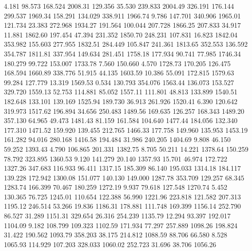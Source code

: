    4.181   98.573  168.524      2008.31
 129.356   35.530  239.833      2004.49
 326.191  176.144  299.537      1969.34
 158.291  134.029  338.911      1966.74
   9.786  147.701  340.906      1965.01
 121.734   23.383  272.968      1934.27
 191.564  100.044  207.728      1866.25
 207.833   34.917   11.881      1862.60
 197.454   47.394  231.352      1850.70
 248.231  107.831   16.823      1842.04
 353.982  155.603  277.955      1832.51
 284.449  105.847  241.361      1813.65
 352.553  136.592  354.787      1811.81
 337.954  149.634  281.451      1758.18
 177.934   90.741   77.985      1746.34
 180.279   99.722  153.007      1733.78
   7.560  150.660    4.570      1728.73
 170.205  126.475  168.594      1660.89
 338.776   51.915   44.135      1603.59
  10.386   55.091  172.815      1579.63
  99.284  127.779   13.319      1569.53
   0.534  130.793  354.076      1563.44
 136.073  153.527  329.720      1559.13
  52.753  114.881   85.052      1557.11
 111.801   48.813  133.899      1540.51
 182.648  133.101  139.169      1525.94
 189.730   36.913  261.926      1520.41
   6.390  120.642  319.973      1517.62
 196.894   34.656  250.483      1489.56
 169.635  126.257  168.343      1489.20
 357.130   64.965   49.473      1481.43
  81.159  161.584  104.640      1477.44
 184.056  132.340  177.310      1471.52
 159.920  139.455  212.765      1466.33
 177.758  149.960  135.953      1453.19
 161.282   94.016  280.168      1416.58
 194.484   31.986  240.205      1404.69
   9.808   46.150   59.252      1393.43
   4.790  106.865  201.331      1382.75
   8.705   50.211   14.221      1378.64
 150.259   78.792  323.895      1360.53
   9.120  141.279   20.140      1357.93
  15.701   46.974  172.722      1327.26
 347.683  116.933   96.411      1317.15
 185.309   86.140  195.033      1314.18
 184.117  139.228  172.942      1300.08
 151.077  140.130  149.000      1287.78
 353.709  129.257   68.345      1283.74
 166.399   70.467  180.259      1272.19
   9.937   79.618  127.548      1270.74
   5.452  130.365   76.725      1245.01
 110.654  122.388   56.990      1221.96
 223.818  121.582  207.313      1195.12
 246.514   53.266   19.836      1186.31
 178.881  111.748  169.399      1156.14
 252.790   86.527   31.289      1151.31
 329.654   26.316  254.239      1135.79
  12.294   93.397  192.017      1104.09
   9.182  108.799  109.323      1102.59
 171.934   77.297  257.889      1098.26
 198.824   31.422  190.562      1093.79
 358.203   38.175  214.812      1088.59
  88.706   66.580    8.528      1065.93
 114.929  107.203  328.033      1060.02
 252.723   31.696   38.706      1056.26

